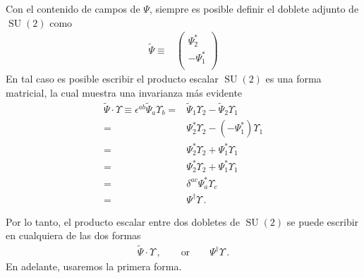 \begin{frame}
 Con el contenido de campos de $\Psi$, siempre es posible definir el doblete adjunto de $\operatorname{SU}(2)$ como 
\begin{align}
\label{eq:conjA}
 \widetilde{\Psi}\equiv & \begin{pmatrix}
                  \Psi_2^{*}\\
                 -\Psi_1^{*}\\
                \end{pmatrix}
\end{align}
En tal caso es posible escribir el producto escalar $\operatorname{SU}(2)$ es una forma matricial, la cual muestra una invarianza más evidente
\begin{align}
\widetilde{\Psi}\cdot \Upsilon\equiv \epsilon^{ab}\widetilde{\Psi}_a \Upsilon_b=&\widetilde{\Psi}_1 \Upsilon_2-\widetilde{\Psi}_2 \Upsilon_1 \nonumber\\
                     =&\Psi_2^{*}\Upsilon_2 -(-\Psi_1^{*}) \Upsilon_1 \nonumber\\
                     =&\Psi_2^{*}\Upsilon_2 +\Psi_1^{*} \Upsilon_1 \nonumber\\
                     =&\Psi_2^{*}\Upsilon_2 +\Psi_1^{*} \Upsilon_1 \nonumber\\
                     =&\delta^{ac}\Psi_a^{*}\Upsilon_c \nonumber\\
                     =&\Psi^{\dagger} \Upsilon\,.
 \end{align}

Por lo tanto, el producto escalar entre dos dobletes de $\operatorname{SU}(2)$ se puede escribir en cualquiera de las dos formas
\begin{align}
  \widetilde{\Psi}\cdot \Upsilon\,, \qquad\text{or}   \qquad \Psi^{\dagger}\Upsilon\,.
\end{align}
En adelante, usaremos la primera forma.



\end{frame}
